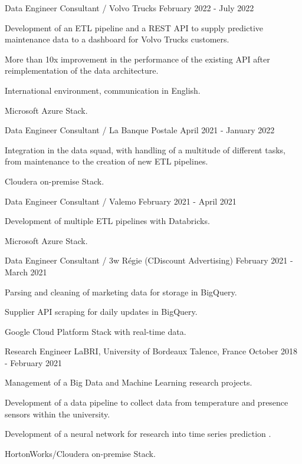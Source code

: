 \begin{cventries}
	\cventry
	{Data Engineer Consultant / Volvo Trucks}{}{}
	{February 2022 - July 2022}
	{
		\begin{cvitems}
			\item {Development of an ETL pipeline and a REST API to supply predictive maintenance data to a dashboard for Volvo Trucks customers.}
			\item {More than 10x improvement in the performance of the existing API after reimplementation of the data architecture.}
			\item {International environment, communication in English.}
			\item {Microsoft Azure Stack.}
		\end{cvitems}
	}
	
	\cventry
	{Data Engineer Consultant / La Banque Postale}{}{}
	{April 2021 - January 2022}
	{
		\begin{cvitems}
			\item {Integration in the data squad, with handling of a multitude of different tasks, from maintenance to the creation of new ETL pipelines.}
			\item {Cloudera on-premise Stack.}
		\end{cvitems}
	}
	
	\newpage

	\cventry
	{Data Engineer Consultant / Valemo}{}{}
	{February 2021 - April 2021}
	{
		\begin{cvitems}
			\item {Development of multiple ETL pipelines with Databricks.}
			\item {Microsoft Azure Stack.}
		\end{cvitems}
	}
	
	\cventry
	{Data Engineer Consultant / 3w Régie (CDiscount Advertising)}{}{}
	{February 2021 - March 2021}
	{
		\begin{cvitems}
			\item {Parsing and cleaning of marketing data for storage in BigQuery.}
			\item {Supplier API scraping for daily updates in BigQuery.}
			\item {Google Cloud Platform Stack with real-time data.}
		\end{cvitems}
	}
	
	\cventry
	{Research Engineer}
	{LaBRI, University of Bordeaux}
	{Talence, France}
	{October 2018 - February 2021}
	{
		\begin{cvitems}
			\item {Management of a Big Data and Machine Learning research projects.}
			\item {Development of a data pipeline to collect data from temperature and presence sensors within the university.}
			\item {Development of a neural network for research into time series prediction .}
			\item {HortonWorks/Cloudera on-premise Stack.}
		\end{cvitems}
	}
	
\end{cventries}
